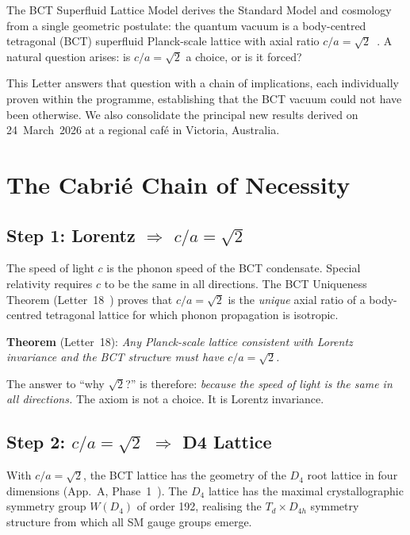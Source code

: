 \documentclass[aps,prl,twocolumn,showpacs,preprintnumbers]{revtex4-2}
\begin{document}
The BCT Superfluid Lattice Model derives the Standard Model and
cosmology from a single geometric postulate: the quantum vacuum is
a body-centred tetragonal (BCT) superfluid Planck-scale lattice
with axial ratio $c/a = \sqrt{2}$~\cite{letter1}.
A natural question arises: is $c/a = \sqrt{2}$ a choice, or
is it forced?

This Letter answers that question with a chain of implications,
each individually proven within the programme, establishing that
the BCT vacuum could not have been otherwise.
We also consolidate the principal new results derived on
24~March~2026 at a regional caf\'e in Victoria, Australia.

\section{The Cabri\'e Chain of Necessity}

\subsection{Step 1: Lorentz $\Rightarrow$ $c/a = \sqrt{2}$}

The speed of light $c$ is the phonon speed of the BCT condensate.
Special relativity requires $c$ to be the same in all directions.
The BCT Uniqueness Theorem (Letter~18~\cite{letter18}) proves that
$c/a = \sqrt{2}$ is the \emph{unique} axial ratio of a body-centred
tetragonal lattice for which phonon propagation is isotropic.

\textbf{Theorem} (Letter~18): \textit{Any Planck-scale lattice consistent
with Lorentz invariance and the BCT structure must have $c/a = \sqrt{2}$.}

The answer to ``why $\sqrt{2}$?'' is therefore:
\emph{because the speed of light is the same in all directions.}
The axiom is not a choice. It is Lorentz invariance.

\subsection{Step 2: $c/a = \sqrt{2}$ $\Rightarrow$ D4 Lattice}

With $c/a = \sqrt{2}$, the BCT lattice has the geometry of the
$D_4$ root lattice in four dimensions (App.~A, Phase~1~\cite{appA}).
The $D_4$ lattice has the maximal crystallographic symmetry group
$W(D_4)$ of order 192, realising the $T_d \times D_{4h}$ symmetry
structure from which all SM gauge groups emerge.
\end{document}

